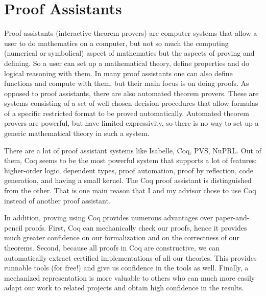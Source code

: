 \section {Proof Assistants}
Proof assistants (interactive theorem provers) are computer systems that allow a user to do mathematics on a computer, but not so much the computing (numerical or symbolical) aspect of mathematics but the aspects of proving and defining. So a user can set up a mathematical theory, define properties and do logical reasoning with them. In many proof assistants one can also define functions and compute with them, but their main focus is on doing proofs. As opposed to proof assistants, there are also automated theorem provers. These are systems consisting of a set of well chosen decision procedures that allow formulas of a specific restricted format to be proved automatically. Automated theorem provers are powerful, but have limited expressivity, so there is no way to set-up a generic mathematical theory in such a system.

There are a lot of proof assistant systems like Isabelle, Coq, PVS, NuPRL. Out of them, Coq seems to be the most powerful system that supports a lot of features: higher-order logic, dependent types, proof automation, proof by reflection, code generation, and having a small kernel. The Coq proof assistant is distinguished from the other. That is one main reason that I and my advisor chose to use Coq instead of another proof assistant.

In addition, proving using Coq provides numerous advantages over paper-and-pencil proofs. First, Coq can mechanically check our proofs, hence it provides much greater confidence on our formalization and on the correctness of our theorems. Second, because all proofs in Coq are constructive, we can automatically extract certified implementations of all our theories. This provides runnable tools (for free!) and give us confidence in the tools as well. Finally, a mechanized representation is more valuable to others who can much more easily
adapt our work to related projects and obtain high confidence in the results.

